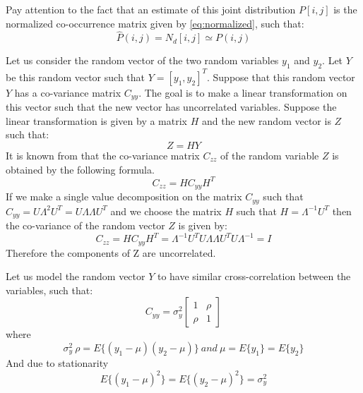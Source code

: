 Pay attention to the fact that an estimate of this joint distribution $P[i,j]$ is the normalized co-occurrence matrix given by \ref{eq:normalized}, such that:
\begin{equation}
    \hat{P}(i,j) = N_d[i,j] \simeq P(i,j)
\end{equation}
\newline

Let us consider the random vector of the two random variables $y_1$ and $y_2$. Let $Y$ be this random vector such that $Y=[y_1, y_2]^T$. Suppose that this random vector $Y$ has a co-variance matrix $C_{yy}$. The goal is to make a linear transformation on this vector such that the new vector has uncorrelated variables. Suppose the linear transformation is given by a matrix $H$ and the new random vector is $Z$ such that:
\begin{equation}
    Z=HY
\end{equation}{}
It is known from \cite{papoulis} that the co-variance matrix $C_{zz}$ of the random variable $Z$ is obtained by the following formula.
\begin{equation}
    C_{zz} = HC_{yy}H^T
\end{equation}
If we make a single value decomposition on the matrix $C_{yy}$ such that $C_{yy} = U\Lambda^2U^T 
=U\Lambda \Lambda U^T$ and we choose the matrix $H$ such that $H = \Lambda^{-1}U^T$ then the co-variance of the random vector $Z$ is given by:
\begin{equation}
    C_{zz} = HC_{yy}H^T = \Lambda^{-1}U^T U\Lambda \Lambda U^T U \Lambda^{-1} = I
\end{equation}{}
Therefore the components of Z are uncorrelated.

Let us model the random vector $Y$ to have similar cross-correlation between the variables, such that:
\begin{equation}
    C_{yy} = \sigma_y^2 
    \begin{bmatrix}
    1&\rho\\
    \rho&1
    \end{bmatrix}
\end{equation}{}
where
\begin{equation}
    \sigma_y^2\ \rho = E\{(y_1-\mu)(y_2-\mu)\} \ and \ \mu = E\{y_1\} = E\{y_2\}
\end{equation}{}
And due to stationarity 
\begin{equation}
    E\{(y_1-\mu)^2\}=E\{(y_2-\mu)^2\} = \sigma_y^2
\end{equation}{}

